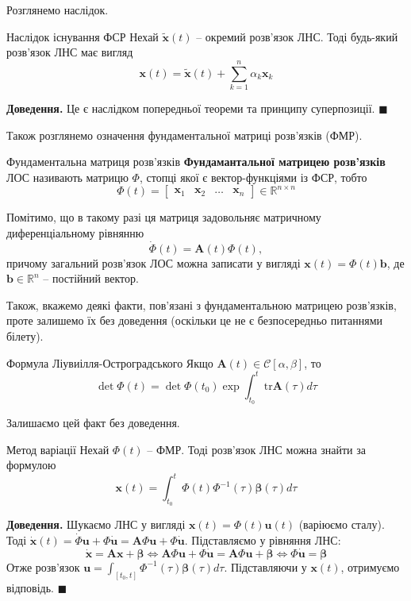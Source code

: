 \documentclass[14pt]{extarticle}
\begin{document}
Розглянемо наслідок.

\begin{statement*}{Наслідок існування ФСР}
    Нехай $\widetilde{\mathbf{x}}(t)$ -- окремий розв'язок ЛНС. Тоді будь-який розв'язок ЛНС має вигляд
    \[
    \mathbf{x}(t) = \widetilde{\mathbf{x}}(t) + \sum_{k=1}^n \alpha_k\mathbf{x}_k
    \]
\end{statement*}

\textbf{Доведення.} Це є наслідком попередньої теореми та принципу суперпозиції. $\blacksquare$

Також розглянемо означення фундаментальної матриці розв'язків (ФМР).

\begin{def*}{Фундаментальна матриця розв'язків}
    \textbf{Фундамантальної матрицею розв'язків} ЛОС називають матрицю $\Phi$, стопці якої є вектор-функціями із ФСР, тобто
    \[
    \Phi(t) = \begin{bmatrix}
        \mathbf{x}_1 & \mathbf{x}_2 & \dots & \mathbf{x}_n
    \end{bmatrix} \in \mathbb{R}^{n \times n}
    \]
\end{def*}

Помітимо, що в такому разі ця матриця задовольняє матричному диференціальному рівнянню
\[
\dot{\Phi}(t) = \mathbf{A}(t)\Phi(t),
\]
причому загальний розв'язок ЛОС можна записати у вигляді $\mathbf{x}(t)=\Phi(t)\mathbf{b}$, де $\mathbf{b} \in \mathbb{R}^n$ -- постійний вектор. 

Також, вкажемо деякі факти, пов'язані з фундаментальною матрицею розв'язків, проте залишемо їх без доведення (оскільки це не є безпосередньо питаннями білету).

\begin{theorem*}{Формула Ліувиілля-Остроградського}
    Якщо $\mathbf{A}(t) \in \mathcal{C}[\alpha,\beta]$, то 
    \[
    \det\Phi(t) = \det\Phi(t_0) \exp\int_{t_0}^t \text{tr}\mathbf{A}(\tau)d\tau
    \]
\end{theorem*}

Залишаємо цей факт без доведення. 

\begin{statement*}{Метод варіації}
    Нехай $\Phi(t)$ -- ФМР. Тоді розв'язок ЛНС можна знайти за формулою
    \[
    \mathbf{x}(t) = \int_{t_0}^t \Phi(t)\Phi^{-1}(\tau)\boldsymbol{\beta}(\tau)d\tau
    \]
\end{statement*}

\textbf{Доведення.} Шукаємо ЛНС у вигляді $\mathbf{x}(t)=\Phi(t)\mathbf{u}(t)$ (варіюємо сталу). Тоді $\dot{\mathbf{x}}(t)=\dot{\Phi}\mathbf{u}+\Phi\dot{\mathbf{u}}=\mathbf{A}\Phi\mathbf{u}+\Phi\dot{\mathbf{u}}$. Підставляємо у рівняння ЛНС:
\[
\dot{\mathbf{x}} = \mathbf{A}\mathbf{x} + \boldsymbol{\beta} \iff \mathbf{A}\Phi\mathbf{u}+\Phi\dot{\mathbf{u}} = \mathbf{A}\Phi\mathbf{u} + \boldsymbol{\beta} \iff \Phi\dot{\mathbf{u}} = \boldsymbol{\beta} 
\]
Отже розв'язок $\mathbf{u}=\int_{[t_0,t]}\Phi^{-1}(\tau)\boldsymbol{\beta}(\tau)d\tau$. Підставляючи у $\mathbf{x}(t)$, отримуємо відповідь. $\blacksquare$
\end{document}
